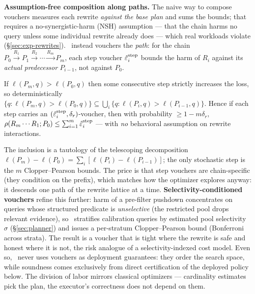 \textbf{Assumption-free composition along paths.} The naive way to compose
vouchers measures each rewrite \emph{against the base plan} and sums the
bounds; that requires a no-synergistic-harm (NSH) assumption --- that the
chain harms no query unless some individual rewrite already does --- which
real workloads violate (\S\ref{sec:exp-rewrites}). \system\ instead
vouchers the \emph{path}: for the chain
$P_0 \xrightarrow{R_1} P_1 \xrightarrow{R_2} \cdots \xrightarrow{R_m} P_m$,
each step voucher $\hat{\varepsilon}_i^{\mathrm{step}}$ bounds the harm of $R_i$
against its \emph{actual predecessor} $P_{i-1}$, not against $P_0$.

\begin{proposition}
\label{prop:composition}
If $\ell(P_m, q) > \ell(P_0, q)$ then some consecutive step strictly
increases the loss, so deterministically
$\{q : \ell(P_m,q) > \ell(P_0,q)\} \subseteq
 \bigcup_{i} \{q : \ell(P_i,q) > \ell(P_{i-1},q)\}$.
Hence if each step carries an $(\hat{\varepsilon}_i^{\mathrm{step}},
\delta_r)$-voucher, then with probability $\ge 1 - m\delta_r$,
$\rho(R_m \cdots R_1; P_0) \le \sum_{i=1}^m \hat{\varepsilon}_i^{\mathrm{step}}$
--- with \emph{no} behavioral assumption on rewrite interactions.
\end{proposition}

The inclusion is a tautology of the telescoping decomposition
$\ell(P_m) - \ell(P_0) = \sum_i [\ell(P_i) - \ell(P_{i-1})]$; the only
stochastic step is the $m$ Clopper--Pearson bounds. The price is that step
vouchers are chain-specific (they condition on the prefix), which matches
how the optimizer explores anyway: it descends one path of the rewrite
lattice at a time. \textbf{Selectivity-conditioned vouchers} refine this
further: harm of a pre-filter pushdown concentrates on queries whose
structured predicate is \emph{unselective} (the restricted pool drops
relevant evidence), so \system\ stratifies calibration queries by estimated
pool selectivity $\sigma$ (\S\ref{sec:planner}) and issues a per-stratum
Clopper--Pearson bound (Bonferroni across strata). The result is a
voucher that is tight where the rewrite is safe and honest where it is
not, the risk analogue of a selectivity-indexed cost model. Even so,
\system\ never uses vouchers as deployment guarantees: they order the
search space, while soundness comes exclusively from direct certification
of the deployed policy below. The division of labor mirrors classical
optimizers --- cardinality estimates pick the plan, the executor's
correctness does not depend on them.

